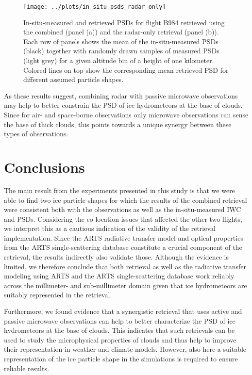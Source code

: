 \documentclass[journal abbreviation, manuscript]{copernicus}
\begin{document}
\begin{figure}[!hbpt]
  \centering
  \texttt{[image: ../plots/in\_situ\_psds\_radar\_only]}
  \caption{In-situ-measured and retrieved PSDs for flight B984
    retrieved using the combined (panel (a)) and the radar-only retrieval
    (panel (b)). Each row of panels shows the mean of the in-situ-measured
    PSDs (black) together with randomly drawn samples of measured PSDs
    (light grey) for a given altitude bin of a height of one kilometer.
    Colored lines on top show the corresponding mean retrieved PSD for
    different assumed particle shapes.}
  \label{fig:in_situ_psds_radar_only}
\end{figure}

As these results suggest, combining radar with passive microwave observations
may help to better constrain the PSD of ice hydrometeors at the base of clouds.
Since for air- and space-borne observations only microwave observations can
sense the base of thick clouds, this points towards a unique synergy between
these types of observations.


\section{Conclusions}
\label{sec:conclusions}

The main result from the experiments presented in this study is that we were
able to find two ice particle shapes for which the results of the combined
retrieval were consistent both with the observations as well as the
in-situ-measured IWC and PSDs. Considering the co-location issues that affected
the other two flights, we interpret this as a cautious indication of the
validity of the retrieval implementation. Since the ARTS radiative transfer
model and optical properties from the ARTS single-scattering database constitute
a crucial component of the retrieval, the results indirectly also validate
those. Although the evidence is limited, we therefore conclude that both
retrieval as well as the radiative transfer modeling using ARTS and the ARTS
single-scattering database work reliably across the millimeter- and
sub-millimeter domain given that ice hydrometeors are suitably represented
in the retrieval.

Furthermore, we found evidence that a synergistic retrieval that uses active and
passive microwave observations can help to better characterize the PSD of ice
hydrometeors at the base of clouds. This indicates that such retrievals can be
used to study the microphysical properties of clouds and thus help to improve
their representation in weather and climate models. However, also here a
suitable representation of the ice particle shape in the simulations is required
to ensure reliable results.
\end{document}
